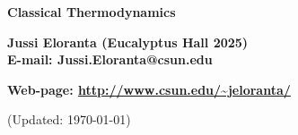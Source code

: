 \documentclass[serif]{beamer}
\begin{document}
\phantom{hauki}
\vfill
\begin{center}
\textbf{Classical Thermodynamics}\\

\vspace{1cm}

\textbf{Jussi Eloranta (Eucalyptus Hall 2025)}\\
\textbf{E-mail: Jussi.Eloranta@csun.edu}\\

\vspace{1cm}

\textbf{Web-page: \url{http://www.csun.edu/~jeloranta/}}\\

\vspace{1cm}

{\tiny (Updated: \today)}

\end{center}
\vfill
\newpage













\end{document}
